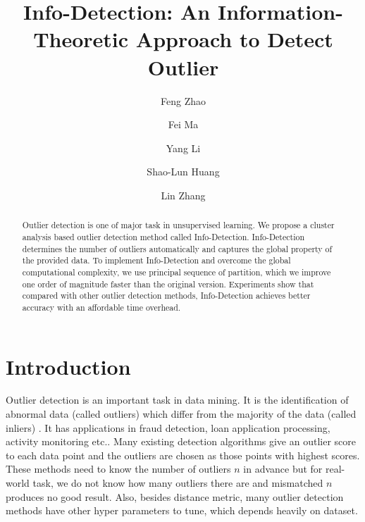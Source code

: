 \documentclass[runningheads]{llncs}
\begin{document}
%
\title{Info-Detection: An Information-Theoretic Approach to Detect Outlier}
%
%
\author{Feng Zhao \and
Fei Ma \and
Yang Li \and
Shao-Lun Huang  \and
Lin Zhang}
%
%
%
\maketitle              %
%
\begin{abstract}
Outlier detection is one of major task in unsupervised learning. We propose a cluster analysis based outlier detection method called Info-Detection. Info-Detection determines the number of outliers automatically and captures the global property of the provided data. To implement Info-Detection and overcome the global computational complexity, we use principal sequence of partition, which we improve one order of magnitude faster than the original version. Experiments show that compared with other outlier detection methods, Info-Detection achieves better accuracy with an affordable time overhead.

\end{abstract}
%
%
%
\section{Introduction}
Outlier detection is an important task in data mining. It is the identification of abnormal data (called outliers) which differ from the majority of the data (called inliers) \cite{grubbs1969procedures}. It has applications in fraud detection, loan application processing, activity monitoring etc.\cite{Hodge2004}. Many existing detection algorithms give an outlier score to each data point and the outliers are chosen as those points with highest scores. These methods need to know the number of outliers $n$ in advance but for real-world task, we do not know how many outliers there are and mismatched $n$ produces no good result. Also, besides distance metric, many outlier detection methods have other hyper parameters to tune, which depends heavily on dataset. 
\end{document}
